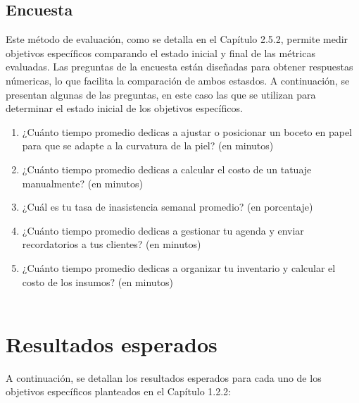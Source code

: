 \subsection{Encuesta}

Este método de evaluación, como se detalla en el Capítulo 2.5.2, permite medir objetivos específicos comparando el estado inicial y final de las métricas evaluadas. Las preguntas de la encuesta están diseñadas para obtener respuestas númericas, lo que facilita la comparación de ambos estasdos. A continuación, se presentan algunas de las preguntas, en este caso las que se utilizan para determinar el estado inicial de los objetivos específicos.

\vspace{\parskip}
\begin{enumerate}
  \item ¿Cuánto tiempo promedio dedicas a ajustar o posicionar un boceto en papel para que se adapte a la curvatura de la piel? (en minutos)\\
  \item ¿Cuánto tiempo promedio dedicas a calcular el costo de un tatuaje manualmente? (en minutos)\\
  \item ¿Cuál es tu tasa de inasistencia semanal promedio? (en porcentaje)\\
  \item ¿Cuánto tiempo promedio dedicas a gestionar tu agenda y enviar recordatorios a tus clientes? (en minutos)\\
  \item ¿Cuánto tiempo promedio dedicas a organizar tu inventario y calcular el costo de los insumos? (en minutos)\\
  \mbox{}\\[-1.01pt]
\end{enumerate}

\section{Resultados esperados}

A continuación, se detallan los resultados esperados para cada uno de los objetivos específicos planteados en el Capítulo 1.2.2:

